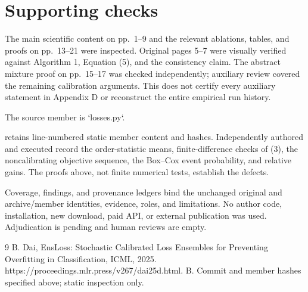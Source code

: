 \documentclass[10pt]{article}
\begin{document}
\section*{Supporting checks}
The main scientific content on pp. 1–9 and the relevant ablations, tables, and proofs on pp. 13–21 were inspected. Original pages 5–7 were visually verified against Algorithm 1, Equation (5), and the consistency claim. The abstract mixture proof on pp. 15–17 was checked independently; auxiliary review covered the remaining calibration arguments. This does not certify every auxiliary statement in Appendix D or reconstruct the entire empirical run history.\par
The source member is `losses.py`.\par
retains line-numbered static member content and hashes. Independently authored and executed record the order-statistic means, finite-difference checks of (3), the noncalibrating objective sequence, the Box–Cox event probability, and relative gains. The proofs above, not finite numerical tests, establish the defects.\par
Coverage, findings, and provenance ledgers bind the unchanged original and archive/member identities, evidence, roles, and limitations. No author code, installation, new download, paid API, or external publication was used. Adjudication is pending and human reviews are empty.\par
9 B. Dai, EnsLoss: Stochastic Calibrated Loss Ensembles for Preventing Overfitting in Classification, ICML, 2025. https://proceedings.mlr.press/v267/dai25d.html. B. Commit and member hashes specified above; static inspection only.\par
\end{document}
